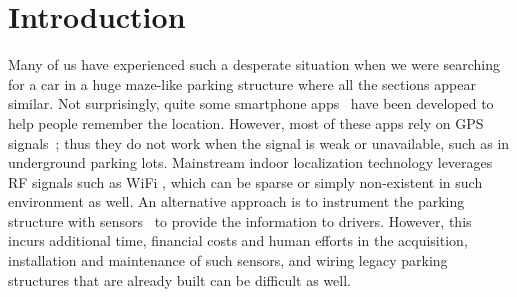 \section{Introduction}
Many of us have experienced such a desperate situation when we were searching for a car in a huge maze-like parking structure where all the sections appear similar. Not surprisingly, quite some smartphone apps~\cite{my_car_parking,car_smart,icarpark,car_finder,carlocator} have been developed to help people remember the location. However, most of these apps rely on GPS signals~\cite{my_car_parking,car_smart}; thus they do not work when the signal is weak or unavailable, such as in underground parking lots. Mainstream indoor localization technology leverages RF signals such as WiFi \cite{bahl00radar, youssef2005horus} , which can be sparse or simply non-existent in such environment as well. An alternative approach is to instrument the parking structure with sensors~\cite{sfpark, mesh_network} to provide the information to drivers. However, this incurs additional time, financial costs and human efforts in the acquisition, installation and maintenance of such sensors, and wiring legacy parking structures that are already built can be difficult as well.

\iffalse
(Problem)
With the rapid growth of personal vehicles amount and growth of urban parking spaces demands, there appear numerous large parking facilities, most of which are built underground. Drivers may find it a nightmare to search for their vehicles in the dim and mazelike parking lot since the parking lots are very large and have similar appearance inside without visual features.

(Why it's hard to solve) Localizing a vehicle in a parking lot is a challenging problem due to the special environment most parking lots have. Although most vehicles are equipped with vehicle-mounted GPS and the mobile devices of the driver also have GPS, the indoor environment especially underground environment makes it impractical to use GPS. Radio Frequency (RF) fingerprinting of WiFi signals which has been a popular approach to indoor localization \cite{bahl00radar, youssef2005horus} do not work here since the poor WiFi coverage in the parking lots. An optional solution is to install additional infrastructure(e.g. sensor network), however, this method is effort-intensive and costly, also, this kind of installation may be infeasible in many parking lots already built.
\fi



